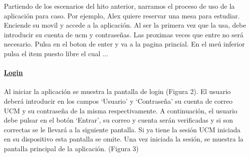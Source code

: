 \documentclass[12pt]{article}
\begin{document}
Partiendo de los escenarios del hito anterior, narramos el proceso de uso de la aplicación para caso. Por ejemplo, Alex quiere reservar una mesa para estudiar. Enciende su movil y accede a la aplicación. Al ser la primera vez que la usa, debe introducir su cuenta de ucm y contraseñas. Las proximas veces que entre no será necesario. Pulsa en el boton de enter y va a la pagina princial. En el meú inferior pulsa el item puesto libre el cual ... 
 \\
 \\
\textbf{\underline{Login}} \\
 \\
Al iniciar la aplicación se muestra la pantalla de login (Figura 2). El usuario deberá introducir en los campos ‘Usuario’ y ‘Contraseña’ su cuenta de correo UCM y su contraseña de la misma respectivamente. A continuación, el usuario debe pulsar en el botón ‘Entrar’, su correo y cuenta serán verificadas y si son correctas se le llevará a la siguiente pantalla. Si ya tiene la sesión UCM iniciada en su dispositivo esta pantalla se omite. Una vez iniciada la sesión, se muestra la pantalla principal de la aplicación. (Figura 3)\\
\end{document}
